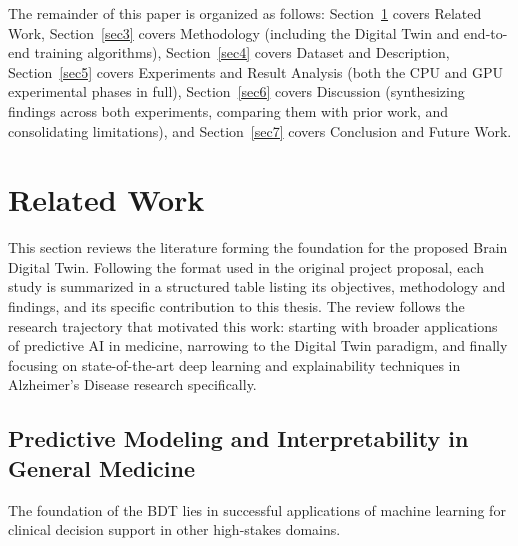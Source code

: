 \documentclass[pdflatex,sn-mathphys-num]{sn-jnl}%
\theoremstyle{thmstyleone}%
\theoremstyle{thmstyletwo}%
\theoremstyle{thmstylethree}%
\begin{document}
The remainder of this paper is organized as follows: Section~\ref{sec2} covers
Related Work, Section~\ref{sec3} covers Methodology (including the Digital Twin
and end-to-end training algorithms), Section~\ref{sec4} covers Dataset and
Description, Section~\ref{sec5} covers Experiments and Result Analysis (both the
CPU and GPU experimental phases in full), Section~\ref{sec6} covers Discussion
(synthesizing findings across both experiments, comparing them with
prior work, and consolidating limitations), and Section~\ref{sec7} covers
Conclusion and Future Work.

\FloatBarrier
\section{Related Work}\label{sec2}

This section reviews the literature forming the foundation for the proposed Brain Digital Twin. Following the format used in the original project proposal, each study is summarized in a structured table listing its objectives, methodology and findings, and its specific contribution to this thesis. The review follows the research trajectory that motivated this work: starting with broader applications of predictive AI in medicine, narrowing to the Digital Twin paradigm, and finally focusing on state-of-the-art deep learning and explainability techniques in Alzheimer's Disease research specifically.

\subsection{Predictive Modeling and Interpretability in General Medicine}\label{sec2_1}

The foundation of the BDT lies in successful applications of machine learning for clinical decision support in other high-stakes domains.
\end{document}

